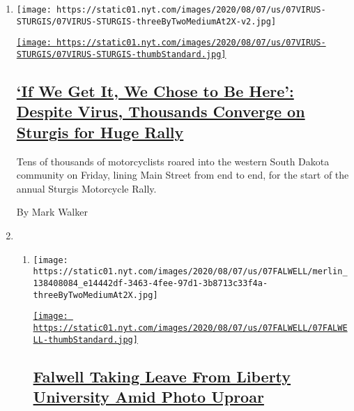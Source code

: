 \begin{enumerate}
\def\labelenumi{\arabic{enumi}.}
\item
  \texttt{[image: https://static01.nyt.com/images/2020/08/07/us/07VIRUS-STURGIS/07VIRUS-STURGIS-threeByTwoMediumAt2X-v2.jpg]}

  \href{/2020/08/07/us/sturgis-motorcyle-rally.html}{\texttt{[image: https://static01.nyt.com/images/2020/08/07/us/07VIRUS-STURGIS/07VIRUS-STURGIS-thumbStandard.jpg]}}

  \hypertarget{if-we-get-it-we-chose-to-be-here-despite-virus-thousands-converge-on-sturgis-for-huge-rally}{%
  \subsection{\texorpdfstring{\href{/2020/08/07/us/sturgis-motorcyle-rally.html}{`If
  We Get It, We Chose to Be Here': Despite Virus, Thousands Converge on
  Sturgis for Huge
  Rally}}{`If We Get It, We Chose to Be Here': Despite Virus, Thousands Converge on Sturgis for Huge Rally}}\label{if-we-get-it-we-chose-to-be-here-despite-virus-thousands-converge-on-sturgis-for-huge-rally}}

  Tens of thousands of motorcyclists roared into the western South
  Dakota community on Friday, lining Main Street from end to end, for
  the start of the annual Sturgis Motorcycle Rally.

  By Mark Walker
\item
  \begin{enumerate}
  \def\labelenumii{\arabic{enumii}.}
  \item
    \texttt{[image: https://static01.nyt.com/images/2020/08/07/us/07FALWELL/merlin\_138408084\_e14442df-3463-4fee-97d1-3b8713c33f4a-threeByTwoMediumAt2X.jpg]}

    \href{/2020/08/07/us/falwell-liberty.html}{\texttt{[image: https://static01.nyt.com/images/2020/08/07/us/07FALWELL/07FALWELL-thumbStandard.jpg]}}

    \hypertarget{falwell-taking-leave-from-liberty-university-amid-photo-uproar}{%
    \subsection{\texorpdfstring{\href{/2020/08/07/us/falwell-liberty.html}{Falwell
    Taking Leave From Liberty University Amid Photo
    Uproar}}{Falwell Taking Leave From Liberty University Amid Photo Uproar}}\label{falwell-taking-leave-from-liberty-university-amid-photo-uproar}}


\end{enumerate}
\end{enumerate}
